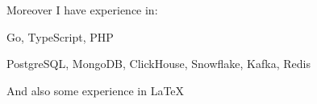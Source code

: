 Moreover I have experience in:
\begin{bulist}
  \item Go, TypeScript, PHP
  \item PostgreSQL, MongoDB, ClickHouse, Snowflake, Kafka, Redis
\end{bulist}
And also some experience in \LaTeX
